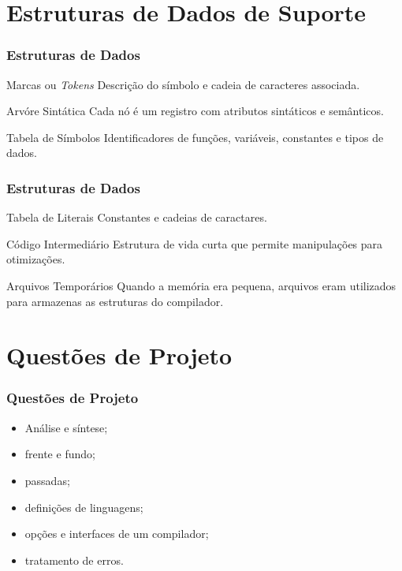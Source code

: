 \documentclass[table]{beamer}
\begin{document}
\section{Estruturas de Dados de Suporte}

\begin{frame}
   \frametitle{Estruturas de Dados}
   \begin{block}{Marcas ou \textit{Tokens}}
   Descrição do símbolo e cadeia de caracteres associada.
   \end{block}

   \begin{block}{Arvóre Sintática}
   Cada nó é um registro com atributos sintáticos e semânticos.
   \end{block}

   \begin{block}{Tabela de Símbolos}
   Identificadores de funções, variáveis, constantes e tipos de dados.
   \end{block}
\end{frame}

\begin{frame}
   \frametitle{Estruturas de Dados}
   \begin{block}{Tabela de Literais}
   Constantes e cadeias de caractares.
   \end{block}

   \begin{block}{Código Intermediário}
   Estrutura de vida curta que permite manipulações para otimizações.
   \end{block}

   \begin{block}{Arquivos Temporários}
   Quando a memória era pequena, arquivos eram utilizados para armazenas as estruturas do compilador.
   \end{block}
\end{frame}

\section{Questões de Projeto}
\begin{frame}
   \frametitle{Questões de Projeto}
   \begin{itemize}
      \item Análise e síntese;
      \item frente e fundo;
      \item passadas;
      \item definições de linguagens;
      \item opções e interfaces de um compilador;
      \item tratamento de erros.
   \end{itemize}
\end{frame}
\end{document}
